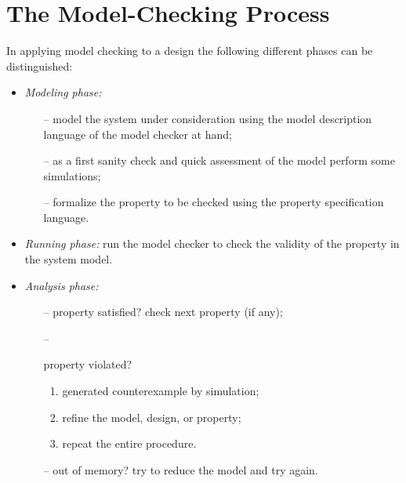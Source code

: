 \documentclass[a4paper,11pt]{article}
\begin{document}
\section*{The Model-Checking Process}


In applying model checking to a design the 
following diﬀerent phases can be distinguished: 
\begin{itemize}
\item \textit{Modeling phase:} 
	\begin{itemize}
	\item[--]model the system under consideration using the model description language of the model checker at hand; 
	\item[--]as a ﬁrst sanity check and quick assessment of the model perform some simulations; 
	\item[--]formalize the property to be checked using the property speciﬁcation language. 
	\end{itemize}
\item \textit{Running phase:} 
run the model checker to check the validity of the property in the system model. 

\item \textit{Analysis phase:}
	\begin{itemize}
		\item[--]{property satisﬁed? check next property (if any);}
		\item[--]{property violated? 
			\begin{enumerate}
				\item generated counterexample by simulation; 
				\item reﬁne the model, design, or property;
				\item repeat the entire procedure.
			\end{enumerate}}
		\item[--]{out of memory? try to reduce the model and try again.}
	\end{itemize}
\end{itemize}
\end{document}
